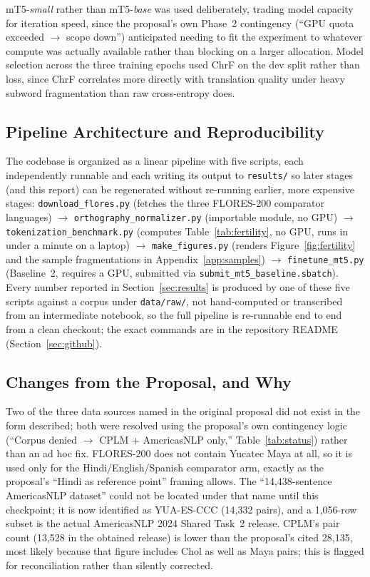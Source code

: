 \documentclass[11pt]{article}
\begin{document}
mT5-\emph{small} rather than mT5-\emph{base} was used deliberately, trading
model capacity for iteration speed, since the proposal's own Phase~2
contingency (``GPU quota exceeded $\to$ scope down'') anticipated needing to
fit the experiment to whatever compute was actually available rather than
blocking on a larger allocation. Model selection across the three training
epochs used ChrF on the dev split rather than loss, since ChrF correlates
more directly with translation quality under heavy subword fragmentation than
raw cross-entropy does.

\subsection{Pipeline Architecture and Reproducibility}
\label{sec:pipeline}

The codebase is organized as a linear pipeline with five scripts, each
independently runnable and each writing its output to \texttt{results/} so
later stages (and this report) can be regenerated without re-running earlier,
more expensive stages:
\texttt{download\_flores.py} (fetches the three FLORES-200 comparator
languages) $\to$
\texttt{orthography\_normalizer.py} (importable module, no GPU) $\to$
\texttt{tokenization\_benchmark.py} (computes Table~\ref{tab:fertility}, no
GPU, runs in under a minute on a laptop) $\to$
\texttt{make\_figures.py} (renders Figure~\ref{fig:fertility} and the sample
fragmentations in Appendix~\ref{app:samples}) $\to$
\texttt{finetune\_mt5.py} (Baseline~2, requires a GPU, submitted via
\texttt{submit\_mt5\_baseline.sbatch}). Every number reported in
Section~\ref{sec:results} is produced by one of these five scripts against a
corpus under \texttt{data/raw/}, not hand-computed or transcribed from an
intermediate notebook, so the full pipeline is re-runnable end to end from a
clean checkout; the exact commands are in the repository README
(Section~\ref{sec:github}).

\subsection{Changes from the Proposal, and Why}

Two of the three data sources named in the original proposal did not exist in
the form described; both were resolved using the proposal's own contingency
logic (``Corpus denied $\to$ CPLM + AmericasNLP only,'' Table~\ref{tab:status})
rather than an ad hoc fix. FLORES-200 does not contain Yucatec Maya at all,
so it is used only for the Hindi/English/Spanish comparator arm, exactly as
the proposal's ``Hindi as reference point'' framing allows. The
``14,438-sentence AmericasNLP dataset'' could not be located under that name
until this checkpoint; it is now identified as YUA-ES-CCC (14,332 pairs),
and a 1,056-row subset is the actual AmericasNLP 2024 Shared Task~2 release.
CPLM's pair count (13,528 in the obtained release) is lower than the
proposal's cited 28,135, most likely because that figure includes Chol as
well as Maya pairs; this is flagged for reconciliation rather than silently
corrected.
\end{document}
